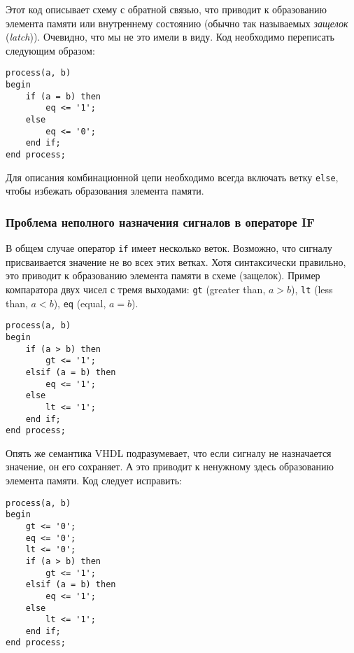 Этот код описывает схему с обратной связью, что приводит к образованию элемента памяти или внутреннему состоянию (обычно так называемых \emph{защелок} (\emph{latch})). Очевидно, что мы не это имели в виду. Код необходимо переписать следующим образом:

\begin{Code}
\begin{lstlisting}
process(a, b)
begin
    if (a = b) then
        eq <= '1';
    else
        eq <= '0';
    end if;
end process;
\end{lstlisting}
\end{Code}

Для описания комбинационной цепи необходимо всегда включать ветку \lstinline?else?, чтобы избежать образования элемента памяти. 

\subsubsection{Проблема неполного назначения сигналов в операторе IF}

В общем случае оператор \lstinline?if? имеет несколько веток. Возможно, что сигналу присваивается значение не во всех этих ветках. Хотя синтаксически правильно, это приводит к образованию элемента памяти в схеме (защелок). Пример компаратора двух чисел с тремя выходами: \lstinline?gt? (greater than, $a > b$), \lstinline?lt? (less than, $a < b$), \lstinline?eq? (equal, $a = b$).

\begin{Code}
\begin{lstlisting}
process(a, b)
begin
    if (a > b) then
        gt <= '1';
    elsif (a = b) then
        eq <= '1';
    else
        lt <= '1';
    end if;
end process;
\end{lstlisting}
\end{Code}

Опять же семантика VHDL подразумевает, что если сигналу не назначается значение, он его сохраняет. А это приводит к ненужному здесь образованию элемента памяти. Код следует исправить:

\begin{Code}
\begin{lstlisting}
process(a, b)
begin
    gt <= '0';
    eq <= '0';
    lt <= '0';
    if (a > b) then
        gt <= '1';
    elsif (a = b) then
        eq <= '1';
    else
        lt <= '1';
    end if;
end process;
\end{lstlisting}
\end{Code}

